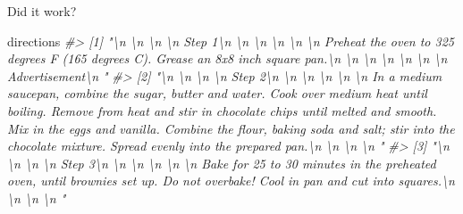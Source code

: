 \documentclass[
  12pt,
]{book}
\newenvironment{Shaded}{\begin{snugshade}}{\end{snugshade}}
\newcommand{\CommentTok}[1]{\textcolor[rgb]{0.37,0.37,0.37}{\textit{#1}}}
\newcommand{\NormalTok}[1]{#1}
\begin{document}
Did it work?

\begin{Shaded}
\begin{Highlighting}[]
\NormalTok{directions}
\CommentTok{\#\textgreater{} [1] "\textbackslash{}n                                \textbackslash{}n                                  \textbackslash{}n                                    \textbackslash{}n                                      Step 1\textbackslash{}n                                    \textbackslash{}n                                  \textbackslash{}n                                \textbackslash{}n                                  \textbackslash{}n                                    \textbackslash{}n                                      Preheat the oven to 325 degrees F (165 degrees C). Grease an 8x8 inch square pan.\textbackslash{}n                                    \textbackslash{}n                                    \textbackslash{}n                                  \textbackslash{}n                                    \textbackslash{}n                                      \textbackslash{}n                                    \textbackslash{}n                                  Advertisement\textbackslash{}n                              "                                                           }
\CommentTok{\#\textgreater{} [2] "\textbackslash{}n                                \textbackslash{}n                                  \textbackslash{}n                                    \textbackslash{}n                                      Step 2\textbackslash{}n                                    \textbackslash{}n                                  \textbackslash{}n                                \textbackslash{}n                                  \textbackslash{}n                                    \textbackslash{}n                                      In a medium saucepan, combine the sugar, butter and water. Cook over medium heat until boiling. Remove from heat and stir in chocolate chips until melted and smooth. Mix in the eggs and vanilla. Combine the flour, baking soda and salt; stir into the chocolate mixture. Spread evenly into the prepared pan.\textbackslash{}n                                    \textbackslash{}n                                    \textbackslash{}n                                  \textbackslash{}n                              "}
\CommentTok{\#\textgreater{} [3] "\textbackslash{}n                                \textbackslash{}n                                  \textbackslash{}n                                    \textbackslash{}n                                      Step 3\textbackslash{}n                                    \textbackslash{}n                                  \textbackslash{}n                                \textbackslash{}n                                  \textbackslash{}n                                    \textbackslash{}n                                      Bake for 25 to 30 minutes in the preheated oven, until brownies set up. Do not overbake! Cool in pan and cut into squares.\textbackslash{}n                                    \textbackslash{}n                                    \textbackslash{}n                                  \textbackslash{}n                              "}

\end{Highlighting}
\end{Shaded}
\end{document}
